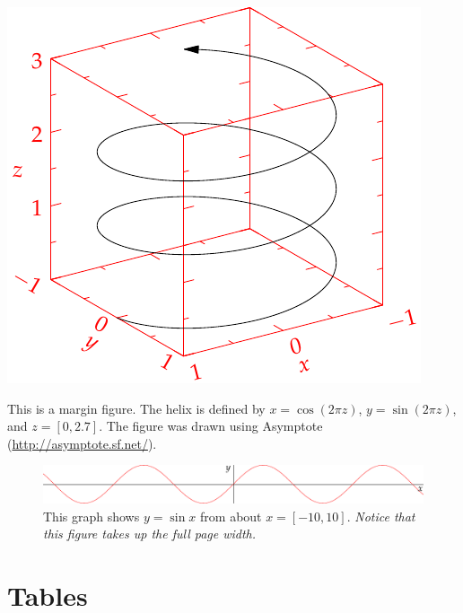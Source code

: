 \documentclass{tufte-book} %
\begin{document}
\begin{marginfigure}
\includegraphics[width=\linewidth]{helix}
\caption{This is a margin figure. The helix is defined by $x = \cos(2\pi z)$, $y = \sin(2\pi z)$, and $z = [0, 2.7]$. The figure was drawn using Asymptote (\url{http://asymptote.sf.net/}).}
\label{fig:marginfig}
\end{marginfigure}

\lipsum[2]

\begin{figure}[h]
\includegraphics[width=\linewidth]{sine.pdf}
\caption{This graph shows $y = \sin x$ from about $x = [-10, 10]$.
\emph{Notice that this figure takes up the full page width.}}
\label{fig:fullfig}
\end{figure}

\lipsum[3]


\section{Tables} 
\end{document}
